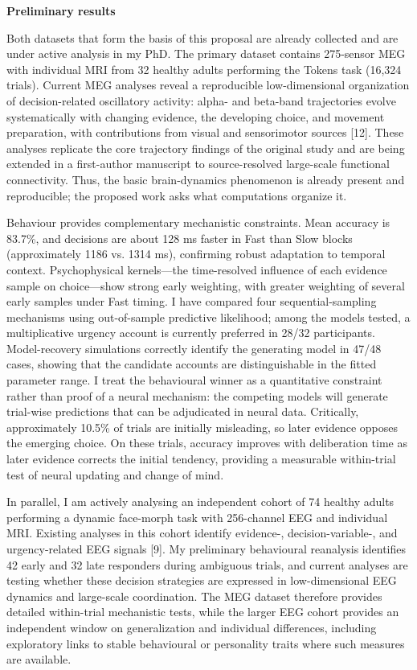 \documentclass[12pt,letterpaper]{article}
\newcommand{\nsercsection}[1]{\Needspace{2\baselineskip}\vspace{3pt}\noindent\textbf{#1}\par\vspace{0pt}}
\newcommand{\citep}[1]{[#1]}
\begin{document}
\nsercsection{Preliminary results}
Both datasets that form the basis of this proposal are already collected and are under active analysis in my PhD. The primary dataset contains 275-sensor MEG with individual MRI from 32 healthy adults performing the Tokens task (16,324 trials). Current MEG analyses reveal a reproducible low-dimensional organization of decision-related oscillatory activity: alpha- and beta-band trajectories evolve systematically with changing evidence, the developing choice, and movement preparation, with contributions from visual and sensorimotor sources \citep{12}. These analyses replicate the core trajectory findings of the original study and are being extended in a first-author manuscript to source-resolved large-scale functional connectivity. Thus, the basic brain-dynamics phenomenon is already present and reproducible; the proposed work asks what computations organize it.

Behaviour provides complementary mechanistic constraints. Mean accuracy is 83.7\%, and decisions are about 128 ms faster in Fast than Slow blocks (approximately 1186 vs. 1314 ms), confirming robust adaptation to temporal context. Psychophysical kernels---the time-resolved influence of each evidence sample on choice---show strong early weighting, with greater weighting of several early samples under Fast timing. I have compared four sequential-sampling mechanisms using out-of-sample predictive likelihood; among the models tested, a multiplicative urgency account is currently preferred in 28/32 participants. Model-recovery simulations correctly identify the generating model in 47/48 cases, showing that the candidate accounts are distinguishable in the fitted parameter range. I treat the behavioural winner as a quantitative constraint rather than proof of a neural mechanism: the competing models will generate trial-wise predictions that can be adjudicated in neural data. Critically, approximately 10.5\% of trials are initially misleading, so later evidence opposes the emerging choice. On these trials, accuracy improves with deliberation time as later evidence corrects the initial tendency, providing a measurable within-trial test of neural updating and change of mind.

In parallel, I am actively analysing an independent cohort of 74 healthy adults performing a dynamic face-morph task with 256-channel EEG and individual MRI. Existing analyses in this cohort identify evidence-, decision-variable-, and urgency-related EEG signals \citep{9}. My preliminary behavioural reanalysis identifies 42 early and 32 late responders during ambiguous trials, and current analyses are testing whether these decision strategies are expressed in low-dimensional EEG dynamics and large-scale coordination. The MEG dataset therefore provides detailed within-trial mechanistic tests, while the larger EEG cohort provides an independent window on generalization and individual differences, including exploratory links to stable behavioural or personality traits where such measures are available.
\end{document}
